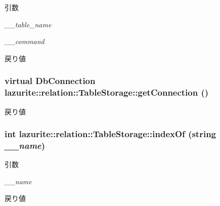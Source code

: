 \begin{DoxyParams}{引数}
\item[{\em \_\-\_\-table\_\-name}]\item[{\em \_\-\_\-command}]\end{DoxyParams}
\begin{DoxyReturn}{戻り値}

\end{DoxyReturn}
\hypertarget{classlazurite_1_1relation_1_1_table_storage_adfc3668d59e3ef868b63960a6b45c130}{
\subsubsection[{getConnection}]{\setlength{\rightskip}{0pt plus 5cm}virtual DbConnection lazurite::relation::TableStorage::getConnection ()}}
\label{classlazurite_1_1relation_1_1_table_storage_adfc3668d59e3ef868b63960a6b45c130}
\begin{DoxyReturn}{戻り値}

\end{DoxyReturn}
\hypertarget{classlazurite_1_1relation_1_1_table_storage_a34ba464646b611d991ab71cc063e908a}{
\subsubsection[{indexOf}]{\setlength{\rightskip}{0pt plus 5cm}int lazurite::relation::TableStorage::indexOf (string {\em \_\-\_\-name})}}
\label{classlazurite_1_1relation_1_1_table_storage_a34ba464646b611d991ab71cc063e908a}

\begin{DoxyParams}{引数}
\item[{\em \_\-\_\-name}]\end{DoxyParams}
\begin{DoxyReturn}{戻り値}

\end{DoxyReturn}


